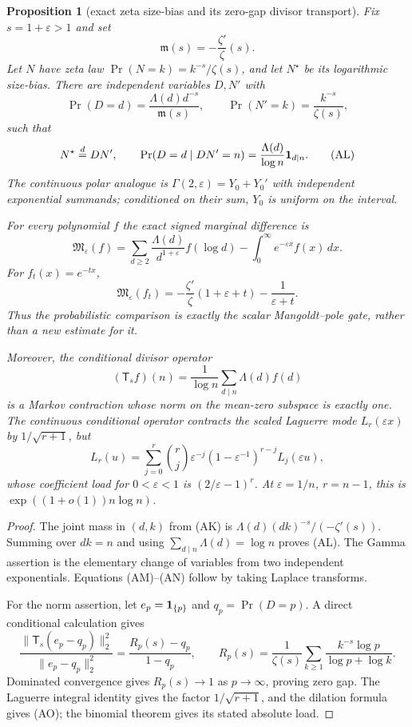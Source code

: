 \documentclass[11pt]{amsart}
\newtheorem{proposition}[theorem]{Proposition}
\theoremstyle{definition}
\theoremstyle{remark}
\theoremstyle{definition}
\begin{document}
\begin{proposition}[exact zeta size-bias and its zero-gap divisor transport]
\label{prop:a1-zeta-size-bias}
Fix $s=1+\varepsilon>1$ and set
\[
 \mathfrak m(s)=-\frac{\zeta'}\zeta(s).
\]
Let $N$ have zeta law $\Pr(N=k)=k^{-s}/\zeta(s)$, and let $N^\star$ be
its logarithmic size-bias.  There are independent variables $D,N'$ with
\[
 \Pr(D=d)=\frac{\Lambda(d)d^{-s}}{\mathfrak m(s)},\qquad
 \Pr(N'=k)=\frac{k^{-s}}{\zeta(s)},                         \tag{AK}
\]
such that
\[
 N^\star\buildrel d\over=DN',\qquad
 \Pr(D=d\mid DN'=n)=\frac{\Lambda(d)}{\log n}{\bf1}_{d\mid n}. \tag{AL}
\]
The continuous polar analogue is
$\Gamma(2,\varepsilon)=Y_0+Y_0'$ with independent exponential summands;
conditioned on their sum, $Y_0$ is uniform on the interval.

For every polynomial $f$ the exact signed marginal difference is
\[
 \mathfrak M_\varepsilon(f)
 =\sum_{d\ge2}\frac{\Lambda(d)}{d^{1+\varepsilon}}f(\log d)
  -\int_0^\infty e^{-\varepsilon x}f(x)\,dx.                \tag{AM}
\]
For $f_t(x)=e^{-tx}$,
\[
 \mathfrak M_\varepsilon(f_t)
 =-\frac{\zeta'}\zeta(1+\varepsilon+t)-\frac1{\varepsilon+t}. \tag{AN}
\]
Thus the probabilistic comparison is exactly the scalar Mangoldt--pole
gate, rather than a new estimate for it.

Moreover, the conditional divisor operator
\[
 (\mathsf T_sf)(n)=\frac1{\log n}\sum_{d\mid n}\Lambda(d)f(d)
\]
is a Markov contraction whose norm on the mean-zero subspace is exactly
one.  The continuous conditional operator contracts the scaled Laguerre
mode $L_r(\varepsilon x)$ by $1/\sqrt{r+1}$, but
\[
 L_r(u)=\sum_{j=0}^r\binom rj\varepsilon^{-j}
 (1-\varepsilon^{-1})^{r-j}L_j(\varepsilon u),              \tag{AO}
\]
whose coefficient load for $0<\varepsilon<1$ is
$(2/\varepsilon-1)^r$.  At $\varepsilon=1/n$, $r=n-1$, this is
$\exp((1+o(1))n\log n)$.
\end{proposition}

\begin{proof}
The joint mass in $(d,k)$ from (AK) is
$\Lambda(d)(dk)^{-s}/(-\zeta'(s))$.  Summing over $dk=n$ and using
$\sum_{d\mid n}\Lambda(d)=\log n$ proves (AL).  The Gamma assertion is
the elementary change of variables from two independent exponentials.
Equations (AM)--(AN) follow by taking Laplace transforms.

For the norm assertion, let $e_p={\bf1}_{\{p\}}$ and
$q_p=\Pr(D=p)$.  A direct conditional calculation gives
\[
 \frac{\|\mathsf T_s(e_p-q_p)\|_2^2}{\|e_p-q_p\|_2^2}
 =\frac{R_p(s)-q_p}{1-q_p},\qquad
 R_p(s)=\frac1{\zeta(s)}\sum_{k\ge1}\frac{k^{-s}\log p}
                                      {\log p+\log k}.
\]
Dominated convergence gives $R_p(s)\to1$ as $p\to\infty$, proving zero
gap.  The Laguerre integral identity gives the factor $1/\sqrt{r+1}$, and
the dilation formula gives (AO); the binomial theorem gives its stated
absolute load.
\end{proof}
\end{document}

